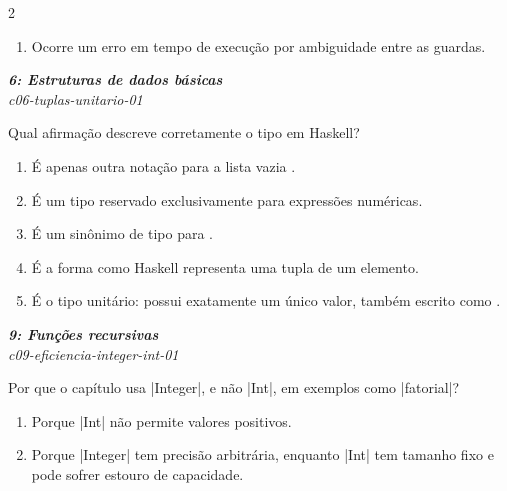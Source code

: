\documentclass[a4paper,10pt,brazil]{article}
\begin{document}
\begin{multicols}{2}
\begin{enumerate}
  \item Ocorre um erro em tempo de execução por ambiguidade entre as guardas.


\end{enumerate}

\begin{flushright}
  \footnotesize
  \textit{\textbf{6: Estruturas de dados básicas}}\\
  \textit{c06-tuplas-unitario-01}\\

\end{flushright}
Qual afirmação descreve corretamente o tipo \haskellinline{()} em Haskell?

\begin{enumerate}
  \item É apenas outra notação para a lista vazia \haskellinline{[]}.

  \item É um tipo reservado exclusivamente para expressões numéricas.

  \item É um sinônimo de tipo para .

  \item É a forma como Haskell representa uma tupla de um elemento.

  \item É o tipo unitário: possui exatamente um único valor, também escrito como \haskellinline{()}.


\end{enumerate}

\begin{flushright}
  \footnotesize
  \textit{\textbf{9: Funções recursivas}}\\
  \textit{c09-eficiencia-integer-int-01}\\

\end{flushright}
Por que o capítulo usa \haskellinline|Integer|, e não \haskellinline|Int|, em exemplos como \haskellinline|fatorial|?

\begin{enumerate}
  \item Porque \haskellinline|Int| não permite valores positivos.

  \item Porque \haskellinline|Integer| tem precisão arbitrária, enquanto \haskellinline|Int| tem tamanho fixo e pode sofrer estouro de capacidade.


\end{enumerate}
\end{multicols}
\end{document}
